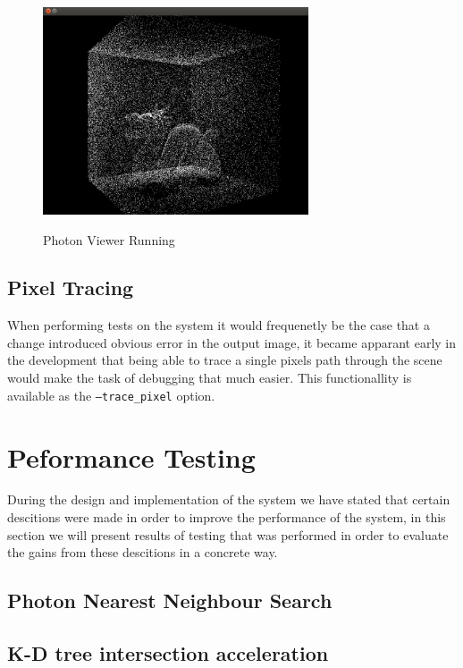 \begin{figure}
\centering
\includegraphics[width=0.7\textwidth]{./images/photon_viewer.png}
\label{fig:photon_viewer}
\caption{Photon Viewer Running}
\end{figure}

\subsection{Pixel Tracing}
When performing tests on the system it would frequenetly be the case that a change introduced obvious error in the output image,
it became apparant early in the development that being able to trace a single pixels path through the scene would make the
task of debugging that much easier. This functionallity is available as the \texttt{--trace\_pixel} option.

\section{Peformance Testing}
During the design and implementation of the system we have stated that certain descitions were made in order to improve the performance
of the system, in this section we will present results of testing that was performed in order to evaluate the gains from these descitions
in a concrete way.

\subsection{Photon Nearest Neighbour Search}

\subsection{K-D tree intersection acceleration}

